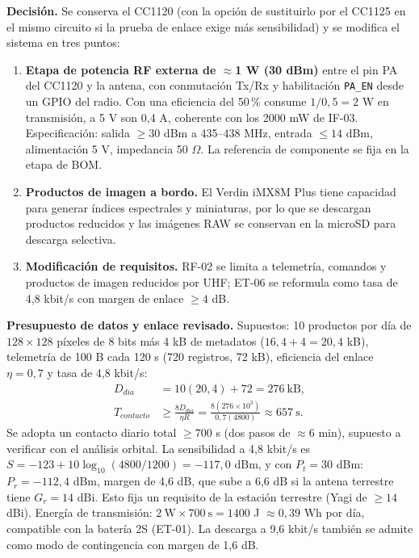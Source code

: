 \documentclass[11pt,letterpaper]{article}
\begin{document}
\textbf{Decisión.} Se conserva el CC1120 (con la opción de sustituirlo por el CC1125 en el mismo circuito si la prueba de enlace exige más sensibilidad) y se modifica el sistema en tres puntos:
\begin{enumerate}
\item \textbf{Etapa de potencia RF externa de $\approx$1 W (30 dBm)} entre el pin PA del CC1120 y la antena, con conmutación Tx/Rx y habilitación \texttt{PA\_EN} desde un GPIO del radio. Con una eficiencia del 50\,\% consume $1/0{,}5=2$ W en transmisión, a 5 V son 0,4 A, coherente con los 2000 mW de IF-03. Especificación: salida $\geq30$ dBm a 435--438 MHz, entrada $\leq14$ dBm, alimentación 5 V, impedancia 50 $\Omega$. La referencia de componente se fija en la etapa de BOM.
\item \textbf{Productos de imagen a bordo.} El Verdin iMX8M Plus tiene capacidad para generar índices espectrales y miniaturas, por lo que se descargan productos reducidos y las imágenes RAW se conservan en la microSD para descarga selectiva.
\item \textbf{Modificación de requisitos.} RF-02 se limita a telemetría, comandos y productos de imagen reducidos por UHF; ET-06 se reformula como tasa de 4,8 kbit/s con margen de enlace $\geq4$ dB.
\end{enumerate}

\textbf{Presupuesto de datos y enlace revisado.} Supuestos: 10 productos por día de $128\times128$ píxeles de 8 bits más 4 kB de metadatos ($16{,}4+4=20{,}4$ kB), telemetría de 100 B cada 120 s (720 registros, 72 kB), eficiencia del enlace $\eta=0{,}7$ y tasa de 4,8 kbit/s:
\begin{align}
D_{dia}&=10(20{,}4)+72=276\ \mathrm{kB},\\
T_{contacto}&\geq\frac{8D_{dia}}{\eta R}=\frac{8(276\times10^3)}{0{,}7(4800)}\approx657\ \mathrm{s}.
\end{align}
Se adopta un contacto diario total $\geq700$ s (dos pasos de $\approx$6 min), supuesto a verificar con el análisis orbital. La sensibilidad a 4,8 kbit/s es $S=-123+10\log_{10}(4800/1200)=-117{,}0$ dBm, y con $P_t=30$ dBm: $P_r=-112{,}4$ dBm, margen de 4,6 dB, que sube a 6,6 dB si la antena terrestre tiene $G_r=14$ dBi. Esto fija un requisito de la estación terrestre (Yagi de $\geq14$ dBi). Energía de transmisión: $2\ \mathrm{W}\times700\ \mathrm{s}=1400$ J $\approx0{,}39$ Wh por día, compatible con la batería 2S (ET-01). La descarga a 9,6 kbit/s también se admite como modo de contingencia con margen de 1,6 dB.
\end{document}
